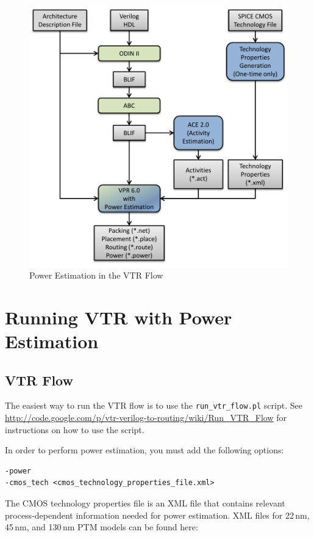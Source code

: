 \documentclass[letterpaper,twoside,10pt]{article}
\begin{document}
\begin{figure}[ht]
	\centering
	\includegraphics[scale=0.8]{images/flow.pdf}
	\caption{Power Estimation in the VTR Flow}
	\label{fig:flow}
\end{figure}


\newpage
\section{Running VTR with Power Estimation} \label{sec:running}
\subsection{VTR Flow}
	The easiest way to run the VTR flow is to use the \texttt{run\_vtr\_flow.pl} script.  See \url{http://code.google.com/p/vtr-verilog-to-routing/wiki/Run_VTR_Flow} for instructions on how to use the script.
	
In order to perform power estimation, you must add the following options:

\begin{BVerbatim}[bgcolor=LightGray, boxwidth=\textwidth]
-power 
-cmos_tech <cmos_technology_properties_file.xml>
\end{BVerbatim}	

The CMOS technology properties file is an XML file that contains relevant process-dependent information needed for power estimation. XML files for 22\,nm, 45\,nm, and 130\,nm PTM models can be found here:
\end{document}
